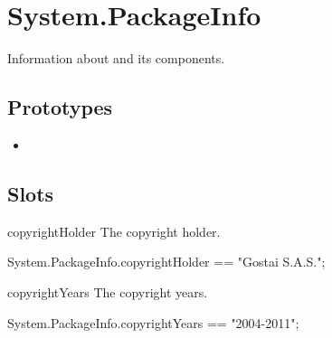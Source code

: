 
\section{System.PackageInfo}
Information about \usdk and its components.

\subsection{Prototypes}
\begin{itemize}
\item {}
\end{itemize}

\subsection{Slots}
\begin{urbiscriptapi}
\item[copyrightHolder] The \usdk copyright holder.
\begin{urbiassert}
System.PackageInfo.copyrightHolder == "Gostai S.A.S.";
\end{urbiassert}

\item[copyrightYears] The \usdk copyright years.
\begin{urbiassert}
System.PackageInfo.copyrightYears == "2004-2011";
\end{urbiassert}
\end{urbiscriptapi}

